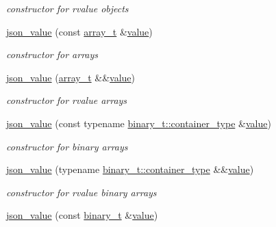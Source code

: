 \begin{DoxyCompactItemize}
\begin{DoxyCompactList}\small\item\em constructor for rvalue objects \end{DoxyCompactList}\item 
\hyperlink{classnlohmann_1_1basic__json_a80a1e2c1da21dccad6471c28facf04ec}{json\+\_\+value} (const \hyperlink{classnlohmann_1_1basic__json_a53700c308d804f84aea5ff05abb2ac4e}{array\+\_\+t} \&\hyperlink{classnlohmann_1_1basic__json_ac9e014095170d72c4c57e3daf8efc059}{value})
\begin{DoxyCompactList}\small\item\em constructor for arrays \end{DoxyCompactList}\item 
\hyperlink{classnlohmann_1_1basic__json_aea49a99ac9d45c1d1bfe3912ed20ffb6}{json\+\_\+value} (\hyperlink{classnlohmann_1_1basic__json_a53700c308d804f84aea5ff05abb2ac4e}{array\+\_\+t} \&\&\hyperlink{classnlohmann_1_1basic__json_ac9e014095170d72c4c57e3daf8efc059}{value})
\begin{DoxyCompactList}\small\item\em constructor for rvalue arrays \end{DoxyCompactList}\item 
\hyperlink{classnlohmann_1_1basic__json_abb5466ba8f6483df6a37e040a7b32a92}{json\+\_\+value} (const typename \hyperlink{classnlohmann_1_1byte__container__with__subtype_a4d27e8633c5a5e3b49dd4ccb06515713}{binary\+\_\+t\+::container\+\_\+type} \&\hyperlink{classnlohmann_1_1basic__json_ac9e014095170d72c4c57e3daf8efc059}{value})
\begin{DoxyCompactList}\small\item\em constructor for binary arrays \end{DoxyCompactList}\item 
\hyperlink{classnlohmann_1_1basic__json_a8bef6d062634dfd09e14d9a3217da8cd}{json\+\_\+value} (typename \hyperlink{classnlohmann_1_1byte__container__with__subtype_a4d27e8633c5a5e3b49dd4ccb06515713}{binary\+\_\+t\+::container\+\_\+type} \&\&\hyperlink{classnlohmann_1_1basic__json_ac9e014095170d72c4c57e3daf8efc059}{value})
\begin{DoxyCompactList}\small\item\em constructor for rvalue binary arrays \end{DoxyCompactList}\item 
\hyperlink{classnlohmann_1_1basic__json_a7e79daa34d13bfd8f03aae00e57649ec}{json\+\_\+value} (const \hyperlink{classnlohmann_1_1basic__json_ad6c955145bebde84d93991ffed7cd389}{binary\+\_\+t} \&\hyperlink{classnlohmann_1_1basic__json_ac9e014095170d72c4c57e3daf8efc059}{value})

\end{DoxyCompactItemize}
